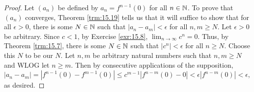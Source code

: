 \documentclass[../main.tex]{subfiles}
\begin{document}
\begin{enumerate}
\begin{enumerate}
\begin{proof}
            Let $(a_n)$ be defined by $a_n=f^{n-1}(0)$ for all $n\in\mathbb{N}$. To prove that $(a_n)$ converges, Theorem \ref{trm:15.19} tells us that it will suffice to show that for all $\epsilon>0$, there is some $N\in\mathbb{N}$ such that $|a_n-a_m|<\epsilon$ for all $n,m\geq N$. Let $\epsilon>0$ be arbitrary. Since $c<1$, by Exercise \ref{exr:15.8}, $\lim_{n\to\infty}c^n=0$. Thus, by Theorem \ref{trm:15.7}, there is some $N\in\mathbb{N}$ such that $|c^n|<\epsilon$ for all $n\geq N$. Choose this $N$ to be our $N$. Let $n,m$ be arbitrary natural numbers such that $n,m\geq N$ and WLOG let $n\geq m$. Then by consecutive applications of the supposition, $|a_n-a_m|=|f^{n-1}(0)-f^{m-1}(0)|\leq c^{m-1}|f^{n-m}(0)-0|<\epsilon|f^{n-m}(0)|<\epsilon$, as desired.




\end{proof}
\end{enumerate}
\end{enumerate}
\end{document}
